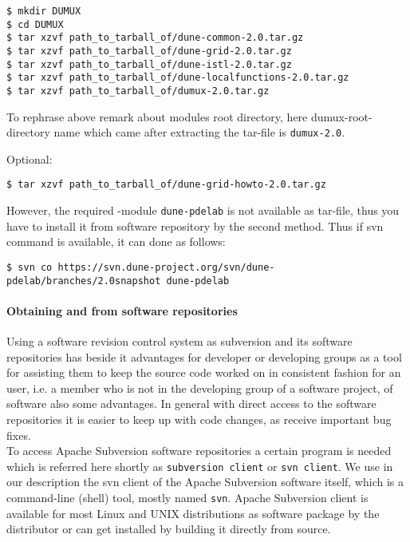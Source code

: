 \begin{lstlisting}[style=Bash]
$ mkdir DUMUX
$ cd DUMUX
$ tar xzvf path_to_tarball_of/dune-common-2.0.tar.gz 
$ tar xzvf path_to_tarball_of/dune-grid-2.0.tar.gz 
$ tar xzvf path_to_tarball_of/dune-istl-2.0.tar.gz 
$ tar xzvf path_to_tarball_of/dune-localfunctions-2.0.tar.gz 
$ tar xzvf path_to_tarball_of/dumux-2.0.tar.gz
\end{lstlisting}

To rephrase above remark about modules root directory, here dumux-root-directory name which came after extracting the tar-file is \texttt{dumux-2.0}.

Optional:
\begin{lstlisting}[style=Bash]
$ tar xzvf path_to_tarball_of/dune-grid-howto-2.0.tar.gz
\end{lstlisting}

However, the required \Dune-module \texttt{dune-pdelab} is not available as tar-file, thus you have to install it from software repository by the second method.  Thus if svn command is available, it can done as follows: 
\begin{lstlisting}[style=Bash]
$ svn co https://svn.dune-project.org/svn/dune-pdelab/branches/2.0snapshot dune-pdelab
\end{lstlisting}

\paragraph{Obtaining \Dune and \Dumux from software repositories} 

Using a software revision control system as subversion and its software repositories has beside it advantages for developer or developing groups as a tool for assisting them to keep the source code worked on in consistent fashion for an user, i.e. a member who is not in the developing group of a software project, of software also some advantages.
In general with direct access to the software repositories it is easier to keep up with code changes, as receive important bug fixes.\\

To access Apache Subversion software repositories a certain program is needed which is referred here shortly as \texttt{subversion client} or \texttt{svn client}. We use in our description the svn client of the Apache Subversion software itself, which is a command-line (shell) tool, mostly named \texttt{svn}. 
Apache Subversion client is available for most Linux and UNIX distributions as software package by the distributor or can get installed by building it directly from source.\\

